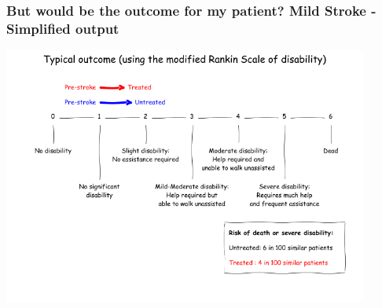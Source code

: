 \begin{frame}
\frametitle{But would be the outcome for my patient? Mild Stroke - Simplified output}

\vspace{5mm}

\begin{center}
\includegraphics[width=0.9\textwidth]{./images_outcome/short_outcome_2}
\end{center}


\end{frame}
